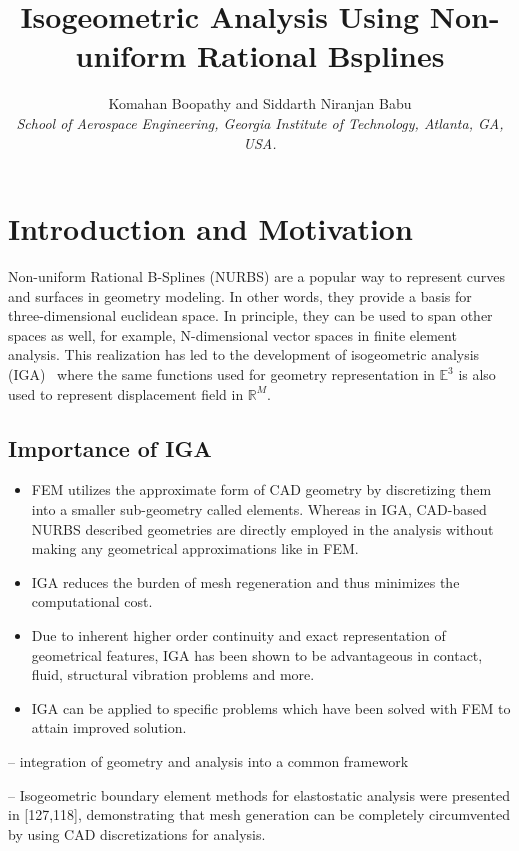 \documentclass[submit,12pt]{aiaa-pretty} %
\title{Isogeometric Analysis Using Non-uniform Rational Bsplines}
\author{Komahan Boopathy  and Siddarth Niranjan Babu\\
  {\normalsize\itshape School of Aerospace Engineering, Georgia Institute of Technology,
    Atlanta, GA, USA. } %
}
\begin{document}
\maketitle

    
\section{Introduction and Motivation}
Non-uniform Rational B-Splines (NURBS) \cite{Piegl:NurbsBook} are a
popular way to represent curves and surfaces in geometry modeling. In
other words, they provide a basis for three-dimensional euclidean
space. In principle, they can be used to span other spaces as well,
for example, N-dimensional vector spaces in finite element
analysis. This realization has led to the development of isogeometric
analysis
(IGA)~\cite{HUGHES20054135,KACPRZYK201487,NGUYEN201589,Agrawal2018,Milic2013,Simpson}
where the same functions used for geometry representation in
$\mathbb{E}^3$ is also used to represent displacement field in
$\mathbb{R}^M$.
\subsection{Importance of IGA}
\begin{itemize}
  \item FEM utilizes the approximate form of CAD geometry by discretizing them into a smaller sub-geometry called elements. Whereas in IGA, CAD-based NURBS described geometries are directly employed in the analysis without making any geometrical approximations like in FEM.
  \item IGA reduces the burden of mesh regeneration and thus minimizes the computational cost. %
  \item Due to inherent higher order continuity and exact representation of geometrical features, IGA has been shown to be advantageous in contact, fluid, structural vibration problems and more. 
  \item IGA can be applied to specific problems which have been solved with FEM to attain improved solution.
\end{itemize}

-- integration of geometry and analysis into a common framework


-- Isogeometric boundary element methods for elastostatic analysis were presented in [127,118],
demonstrating that mesh generation can be completely circumvented by using CAD discretizations for analysis.
\end{document}
